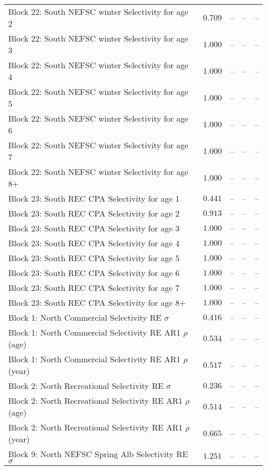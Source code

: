 \documentclass[
]{article}
\begin{document}
\begin{landscape}
\begin{longtable}[t]{lrrrr}
\addlinespace
Block 22: South NEFSC winter Selectivity for age 2 & $0.709$ & -- & -- & --\\
Block 22: South NEFSC winter Selectivity for age 3 & $1.000$ & -- & -- & --\\
Block 22: South NEFSC winter Selectivity for age 4 & $1.000$ & -- & -- & --\\
Block 22: South NEFSC winter Selectivity for age 5 & $1.000$ & -- & -- & --\\
Block 22: South NEFSC winter Selectivity for age 6 & $1.000$ & -- & -- & --\\
\addlinespace
Block 22: South NEFSC winter Selectivity for age 7 & $1.000$ & -- & -- & --\\
Block 22: South NEFSC winter Selectivity for age 8+ & $1.000$ & -- & -- & --\\
Block 23: South REC CPA Selectivity for age 1 & $0.441$ & -- & -- & --\\
Block 23: South REC CPA Selectivity for age 2 & $0.913$ & -- & -- & --\\
Block 23: South REC CPA Selectivity for age 3 & $1.000$ & -- & -- & --\\
\addlinespace
Block 23: South REC CPA Selectivity for age 4 & $1.000$ & -- & -- & --\\
Block 23: South REC CPA Selectivity for age 5 & $1.000$ & -- & -- & --\\
Block 23: South REC CPA Selectivity for age 6 & $1.000$ & -- & -- & --\\
Block 23: South REC CPA Selectivity for age 7 & $1.000$ & -- & -- & --\\
Block 23: South REC CPA Selectivity for age 8+ & $1.000$ & -- & -- & --\\
\addlinespace
Block 1: North Commercial Selectivity RE $\sigma$ & $0.416$ & -- & -- & --\\
Block 1: North Commercial Selectivity RE AR1 $\rho$ (age) & $0.534$ & -- & -- & --\\
Block 1: North Commercial Selectivity RE AR1 $\rho$ (year) & $0.517$ & -- & -- & --\\
Block 2: North Recreational Selectivity RE $\sigma$ & $0.236$ & -- & -- & --\\
Block 2: North Recreational Selectivity RE AR1 $\rho$ (age) & $0.514$ & -- & -- & --\\
\addlinespace
Block 2: North Recreational Selectivity RE AR1 $\rho$ (year) & $0.665$ & -- & -- & --\\
Block 9: North NEFSC Spring Alb Selectivity RE $\sigma$ & $1.251$ & -- & -- & --\\

\end{longtable}
\end{landscape}
\end{document}

